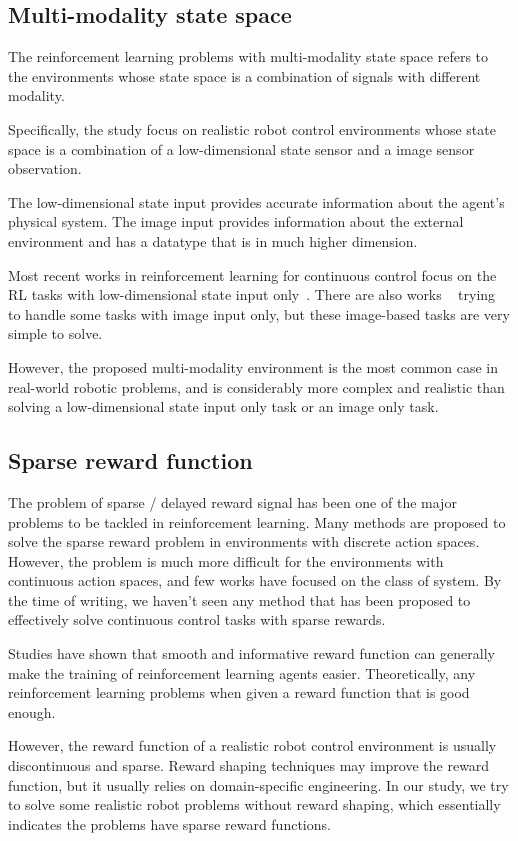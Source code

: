 \subsection{Multi-modality state space}

The reinforcement learning problems with multi-modality state space refers to the environments whose state space is a combination of signals with different modality.

Specifically, the study focus on realistic robot control environments whose state space is a combination of a low-dimensional state sensor and a image sensor observation.

The low-dimensional state input provides accurate information about the agent's physical system. The image input provides information about the external environment and has a datatype that is in much higher dimension.

Most recent works in reinforcement learning for continuous control focus on the RL tasks with low-dimensional state input only~\cite{duan2016benchmarking}. There are also works ~\cite{wu2017scalable} trying to handle some tasks with image input only, but these image-based tasks are very simple to solve.

However, the proposed multi-modality environment is the most common case in real-world robotic problems, and is considerably more complex and realistic than solving a low-dimensional state input only task or an image only task.


\subsection{Sparse reward function}
The problem of sparse / delayed reward signal has been one of the major problems to be tackled in reinforcement learning. Many methods are proposed to solve the sparse reward problem in environments with discrete action spaces. However, the problem is much more difficult for the environments with continuous action spaces, and few works have focused on the class of system. By the time of writing, we haven't seen any method that has been proposed to effectively solve continuous control tasks with sparse rewards.

Studies have shown that smooth and informative reward function can generally make the training of reinforcement learning agents easier. Theoretically, any reinforcement learning problems when given a reward function that is good enough.

However, the reward function of a realistic robot control environment is usually discontinuous and sparse. Reward shaping techniques may improve the reward function, but it usually relies on domain-specific engineering. In our study, we try to solve some realistic robot problems without reward shaping, which essentially indicates the problems have sparse reward functions.


